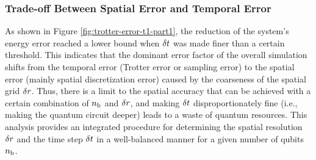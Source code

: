 \documentclass[aip-draft.tex]{subfiles}
\begin{document}
\subsubsection{Trade-off Between Spatial Error and Temporal Error}
As shown in Figure \ref{fig:trotter-error-t1-part1}, the reduction of the
system's energy error reached a lower bound when $\delta t$ was made finer than a
certain threshold. This indicates that the dominant error factor of the overall
simulation shifts from the temporal error (Trotter error or sampling error) to
the spatial error (mainly spatial discretization error) caused by the coarseness
of the spatial grid $\delta r$. Thus, there is a limit to the spatial accuracy
that can be achieved with a certain combination of $n_{\mathrm{b}}$ and $\delta r$, and
making $\delta t$ disproportionately fine (i.e., making the quantum circuit
deeper) leads to a waste of quantum resources. This analysis provides an
integrated procedure for determining the spatial resolution $\delta r$ and the
time step $\delta t$ in a well-balanced manner for a given number of qubits
$n_{\mathrm{b}}$.


\ifSubfilesClassLoaded{}{}
\end{document}
